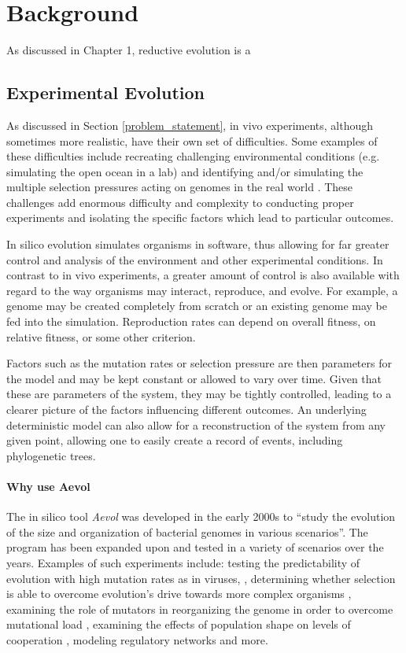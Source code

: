 \chapter{Background}\label{ch:background}
As discussed in Chapter 1, reductive evolution is a  

\section{Experimental Evolution}
As discussed in Section \ref{problem_statement}, in vivo experiments, although sometimes more realistic, have their own set of difficulties. Some examples of these difficulties include recreating challenging environmental conditions (e.g. simulating the open ocean in a lab) and identifying and/or simulating the multiple selection pressures acting on genomes in the real world \cite{Batut.2013}. These challenges add enormous difficulty and complexity to conducting proper experiments and isolating the specific factors which lead to particular outcomes. 

In silico evolution simulates organisms in software, thus allowing for far greater control and analysis of the environment and other experimental conditions. In contrast to in vivo experiments, a greater amount of control is also available with regard to the way organisms may interact, reproduce, and evolve. For example, a genome may be created completely from scratch or an existing genome may be fed into the simulation. Reproduction rates can depend on overall fitness, on relative fitness, or some other criterion.

Factors such as the mutation rates or selection pressure are then parameters for the model and may be kept constant or allowed to vary over time. Given that these are parameters of the system, they may be tightly controlled, leading to a clearer picture of the factors influencing different outcomes. An underlying deterministic model can also allow for a reconstruction of the system from any given point, allowing one to easily create a record of events, including phylogenetic trees. 

\subsubsection{Why use Aevol}
The in silico tool \textit{Aevol} was developed in the early 2000s to ``study the evolution of the size and organization of bacterial genomes in various scenarios''\cite{Batut.2013}. The program has been expanded upon and tested in a variety of scenarios over the years. Examples of such experiments include: testing the predictability of evolution with high mutation rates as in viruses, \cite{beslon:hal-01577115}, determining whether selection is able to overcome evolution's drive towards more complex organisms \cite{doi:10.1162}, examining the role of mutators in reorganizing the genome in order to overcome mutational load \cite{doi:10.1186/s12862-019-1507-z}, examining the effects of population shape on levels of cooperation \cite{doi:10.1162/978-0-262-33936-0-ch057}, modeling regulatory networks \cite{sanchezdehesa:hal-01502737} and more. 
 
